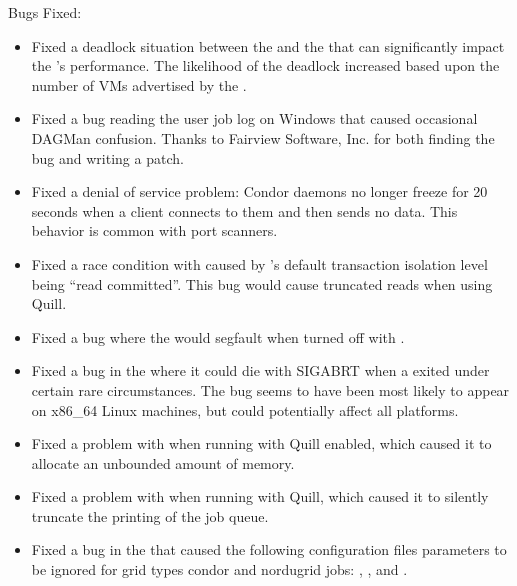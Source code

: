\noindent Bugs Fixed:

\begin{itemize}

\item Fixed a deadlock situation between the  and
the  that can
significantly impact the 's performance.  The likelihood of the
deadlock increased based upon the number of VMs advertised by the
.

\item Fixed a bug reading the user job log on Windows that caused
occasional DAGMan confusion.
Thanks to Fairview Software, Inc. for
both finding the bug and writing a patch.

\item Fixed a denial of service problem: Condor daemons no longer freeze
for 20 seconds when a client connects to them and then sends no data.
This behavior is common with port scanners.

\item Fixed a race condition with  caused by
's default transaction isolation level being ``read
committed''. 
This bug would cause truncated  reads when using Quill.

\item Fixed a bug where the  would segfault when
turned off with  .

\item Fixed a bug in the  where it could die with
  SIGABRT when a  exited under certain rare
  circumstances.
  The bug seems to have been most likely to appear on x86\_64 Linux
  machines, but could potentially affect all platforms.

\item Fixed a problem with  when running with Quill enabled,
which caused it to allocate an unbounded amount of memory.

\item Fixed a problem with  when running with Quill, which caused
it to silently truncate the printing of the job queue.

\item Fixed a bug in the  that caused the following
configuration files parameters to be ignored for grid types condor and
nordugrid jobs: ,
, and
.


\end{itemize}
